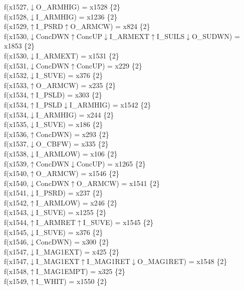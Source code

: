 f(x1527,$\downarrow$O\_ARMHIG) = x1528 \{2\} \\  
f(x1528,$\downarrow$I\_ARMHIG) = x1236 \{2\} \\  
f(x1529,$\uparrow$I\_PSRD$\uparrow$O\_ARMCW) = x824 \{2\} \\  
f(x1530,$\downarrow$ConcDWN$\uparrow$ConcUP$\downarrow$I\_ARMEXT$\uparrow$I\_SUILS$\downarrow$O\_SUDWN) = x1853 \{2\} \\  
f(x1530,$\downarrow$I\_ARMEXT) = x1531 \{2\} \\  
f(x1531,$\downarrow$ConcDWN$\uparrow$ConcUP) = x229 \{2\} \\  
f(x1532,$\downarrow$I\_SUVE) = x376 \{2\} \\  
f(x1533,$\uparrow$O\_ARMCW) = x235 \{2\} \\  
f(x1534,$\uparrow$I\_PSLD) = x303 \{2\} \\  
f(x1534,$\uparrow$I\_PSLD$\downarrow$I\_ARMHIG) = x1542 \{2\} \\  
f(x1534,$\downarrow$I\_ARMHIG) = x244 \{2\} \\  
f(x1535,$\downarrow$I\_SUVE) = x186 \{2\} \\  
f(x1536,$\uparrow$ConcDWN) = x293 \{2\} \\  
f(x1537,$\downarrow$O\_CBFW) = x335 \{2\} \\  
f(x1538,$\downarrow$I\_ARMLOW) = x106 \{2\} \\  
f(x1539,$\uparrow$ConcDWN$\downarrow$ConcUP) = x1265 \{2\} \\  
f(x1540,$\uparrow$O\_ARMCW) = x1546 \{2\} \\  
f(x1540,$\downarrow$ConcDWN$\uparrow$O\_ARMCW) = x1541 \{2\} \\  
f(x1541,$\downarrow$I\_PSRD) = x237 \{2\} \\  
f(x1542,$\uparrow$I\_ARMLOW) = x246 \{2\} \\  
f(x1543,$\downarrow$I\_SUVE) = x1255 \{2\} \\  
f(x1544,$\uparrow$I\_ARMRET$\uparrow$I\_SUVE) = x1545 \{2\} \\  
f(x1545,$\downarrow$I\_SUVE) = x376 \{2\} \\  
f(x1546,$\downarrow$ConcDWN) = x300 \{2\} \\  
f(x1547,$\downarrow$I\_MAG1EXT) = x425 \{2\} \\  
f(x1547,$\downarrow$I\_MAG1EXT$\uparrow$I\_MAG1RET$\downarrow$O\_MAG1RET) = x1548 \{2\} \\  
f(x1548,$\uparrow$I\_MAG1EMPT) = x325 \{2\} \\  
f(x1549,$\uparrow$I\_WHIT) = x1550 \{2\} \\  
